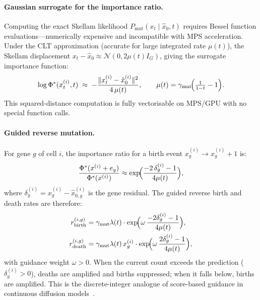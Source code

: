 \documentclass[11pt]{article}
\begin{document}
\paragraph{Gaussian surrogate for the importance ratio.}
Computing the exact Skellam likelihood $P_{\text{mut}}(x_t \mid \hat{x}_0, t)$ requires Bessel function evaluations---numerically expensive and incompatible with MPS acceleration.
Under the CLT approximation (accurate for large integrated rate $\mu(t)$), the Skellam displacement $x_t - \hat{x}_0 \approx \mathcal{N}(0, 2\mu(t)I_G)$, giving the surrogate importance function:
\begin{equation}
  \log \Phi^*(x^{(i)}_t, t) \;\approx\; -\frac{\|x^{(i)}_t - \hat{x}_0^{(i)}\|^2}{4\,\mu(t)},
  \qquad \mu(t) = \gamma_{\text{mut}}\!\Bigl(\tfrac{1}{1-t}-1\Bigr).
  \label{eq:gaussian_ipm}
\end{equation}
This squared-distance computation is fully vectorisable on MPS/GPU with no special function calls.

\paragraph{Guided reverse mutation.}
For gene $g$ of cell $i$, the importance ratio for a birth event $x_g^{(i)} \to x_g^{(i)} + 1$ is:
\[
  \frac{\Phi^*(x^{(i)} + e_g)}{\Phi^*(x^{(i)})}
  \approx \exp\!\Bigl(\frac{-2\,\delta_g^{(i)} - 1}{4\mu(t)}\Bigr),
\]
where $\delta_g^{(i)} = x_g^{(i)} - \hat{x}_{0,g}^{(i)}$ is the gene residual.
The guided reverse birth and death rates are therefore:
\begin{align}
  r_{\text{birth}}^{(i,g)} &= \gamma_{\text{mut}}\lambda(t) \cdot
    \exp\!\Bigl(\omega\,\frac{-2\delta_g^{(i)} - 1}{4\mu(t)}\Bigr), \notag\\
  r_{\text{death}}^{(i,g)} &= \gamma_{\text{mut}}\lambda(t)\,x_g^{(i)} \cdot
    \exp\!\Bigl(\omega\,\frac{2\delta_g^{(i)} - 1}{4\mu(t)}\Bigr),
  \label{eq:guided_rates}
\end{align}
with guidance weight $\omega > 0$.
When the current count exceeds the prediction ($\delta_g^{(i)} > 0$), deaths are amplified and births suppressed; when it falls below, births are amplified.
This is the discrete-integer analogue of score-based guidance in continuous diffusion models~\citep{dhariwal2021diffusion}.
\end{document}
